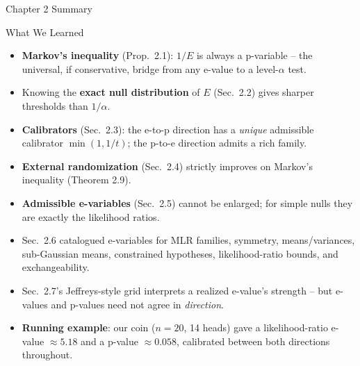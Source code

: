 \documentclass[aspectratio=169,10pt]{beamer}
\begin{document}
\begin{frame}{Chapter 2 Summary}
  \begin{block}{What We Learned}
    \begin{itemize}
      \item \textbf{Markov's inequality} (Prop.\ 2.1): $1/E$ is always a
        p-variable -- the universal, if conservative, bridge from any
        e-value to a level-$\alpha$ test.
      \item Knowing the \textbf{exact null distribution} of $E$ (Sec.~2.2)
        gives sharper thresholds than $1/\alpha$.
      \item \textbf{Calibrators} (Sec.~2.3): the e-to-p direction has a
        \emph{unique} admissible calibrator $\min(1,1/t)$; the p-to-e
        direction admits a rich family.
      \item \textbf{External randomization} (Sec.~2.4) strictly improves
        on Markov's inequality (Theorem 2.9).
      \item \textbf{Admissible e-variables} (Sec.~2.5) cannot be enlarged;
        for simple nulls they are exactly the likelihood ratios.
      \item Sec.~2.6 catalogued e-variables for MLR families, symmetry,
        means/variances, sub-Gaussian means, constrained hypotheses,
        likelihood-ratio bounds, and exchangeability.
      \item Sec.~2.7's Jeffreys-style grid interprets a realized e-value's
        strength -- but e-values and p-values need not agree in
        \emph{direction}.
      \item \textbf{Running example}: our coin ($n=20$, 14 heads) gave a
        likelihood-ratio e-value $\approx5.18$ and a p-value
        $\approx0.058$, calibrated between both directions throughout.
    \end{itemize}
  \end{block}
\end{frame}
\end{document}
